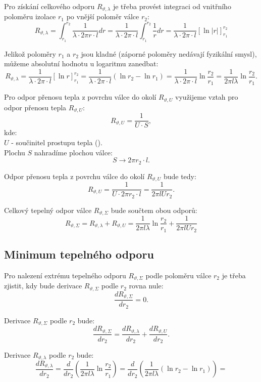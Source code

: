 \documentclass{article}
\begin{document}
Pro získání celkového odporu $R_{\vartheta,\lambda}$ je třeba provést integraci od vnitřního poloměru izolace $r_1$ po vnější poloměr válce $r_2$:
$$
    R_{\vartheta,\lambda} = \int_{r_1}^{r_2} \frac{1}{\lambda \cdot 2 \pi r \cdot l} dr = \frac{1}{\lambda \cdot 2 \pi \cdot l} \int_{r_1}^{r_2} \frac{1}{r} dr = \frac{1}{\lambda \cdot 2 \pi \cdot l} \left[ \ln |r| \right]_{r_1}^{r_2}
$$

Jelikož poloměry $r_1$ a $r_2$ jsou kladné (záporné poloměry nedávají fyzikální smysl), můžeme absolutní hodnotu u logaritmu zanedbat:
$$
    R_{\vartheta,\lambda} = \frac{1}{\lambda \cdot 2 \pi \cdot l} \left[ \ln r \right]_{r_1}^{r_2} = \frac{1}{\lambda \cdot 2 \pi \cdot l} \left( \ln r_2 - \ln r_1 \right) = \frac{1}{\lambda \cdot 2 \pi \cdot l} \ln \frac{r_2}{r_1} = \frac{1}{2 \pi l \lambda} \ln \frac{r_2}{r_1}.
$$

Pro odpor přenosu tepla z povrchu válce do okolí $R_{\vartheta,U}$ využijeme vztah pro odpor přenosu tepla $R_{\vartheta,U}$:
$$
    R_{\vartheta,U} = \frac{1}{U \cdot S},
$$
kde:\\
$U$ - součinitel prostupu tepla (\ueqWandMinvsqKinv).\\

Plochu $S$ nahradíme plochou válce:
$$
    S \rightarrow 2 \pi r_2 \cdot l.
$$

Odpor přenosu tepla z povrchu válce do okolí $R_{\vartheta,U}$ bude tedy:
$$
    R_{\vartheta,U} = \frac{1}{U \cdot 2 \pi r_2 \cdot l} = \frac{1}{2 \pi l U r_2}.
$$

Celkový tepelný odpor válce $R_{\vartheta, \Sigma}$ bude součtem obou odporů:
$$
    R_{\vartheta,\Sigma} = R_{\vartheta,\lambda} + R_{\vartheta,U} = \frac{1}{2 \pi l \lambda} \ln \frac{r_2}{r_1} + \frac{1}{2 \pi l U r_2}
$$


\subsection{Minimum tepelného odporu}

Pro nalezení extrému tepelného odporu $R_{\vartheta,\Sigma}$ podle poloměru válce $r_2$ je třeba zjistit, kdy bude derivace $R_{\vartheta,\Sigma}$ podle $r_2$ rovna nule:
$$
    \frac{dR_{\vartheta,\Sigma}}{dr_2} = 0.
$$

Derivace $R_{\vartheta,\Sigma}$ podle $r_2$ bude:
$$
    \frac{dR_{\vartheta,\Sigma}}{dr_2} = \frac{dR_{\vartheta,\lambda}}{dr_2} + \frac{dR_{\vartheta,U}}{dr_2}.
$$

Derivace $R_{\vartheta,\lambda}$ podle $r_2$ bude:
$$
    \frac{dR_{\vartheta,\lambda}}{dr_2} = \frac{d}{dr_2} \left( \frac{1}{2 \pi l \lambda} \ln \frac{r_2}{r_1} \right) = \frac{d}{dr_2} \left( \frac{1}{2 \pi l \lambda} \left(\ln r_2 - \ln r_1 \right) \right) =
$$
\end{document}
